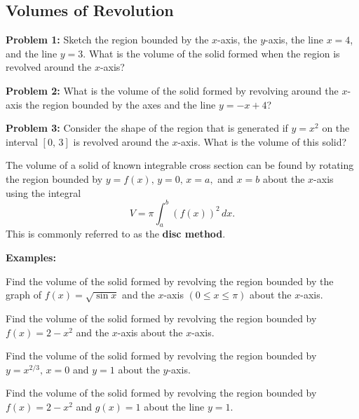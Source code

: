 \subsection*{Volumes of Revolution}
\textbf{Problem 1:} Sketch the region bounded by the $x$-axis, the $y$-axis, the line $x=4$, and the line $y=3$. What is the volume of the solid formed when the region is revolved around the $x$-axis?

\textbf{Problem 2:} What is the volume of the solid formed by revolving around the $x$-axis the region bounded by the axes and the line $y=-x+4$?

\textbf{Problem 3:} Consider the shape of the region that is generated if $y=x^2$ on the interval $[0,\,3]$ is revolved around the $x$-axis. What is the volume of this solid?

\newpage


\begin{tcolorbox}[title= VOLUME OF A SOLID OF REVOLUTION,colframe=black,sharp corners,colback=white,colbacktitle=white,coltitle=black,boxrule=1pt]

     The volume of a solid of known integrable cross section can be found by rotating the region bounded by $y=f(x),\,y=0,\,x=a,$ and $x=b$ about the $x$-axis using the integral
     \[V=\pi\int_a^b\left(f(x)\right)^2\,dx.\]
     This is commonly referred to as the \textbf{disc method}.
    
\end{tcolorbox}
\textbf{Examples:}
\begin{questions}
    \question Find the volume of the solid formed by revolving the region bounded by the graph of $f(x)=\sqrt{\sin x}$ and the $x$-axis $\left(0\le x\le\pi\right)$ about the $x$-axis.
    
    \question Find the volume of the solid formed by revolving the region bounded by $f(x)=2-x^2$ and the $x$-axis about the $x$-axis.
    
    \question Find the volume of the solid formed by revolving the region bounded by $y=x^{2/3},\, x=0$ and $y=1$ about the $y$-axis.
    
    \newpage
    
    \question Find the volume of the solid formed by revolving the region bounded by $f(x)=2-x^2$ and $g(x)=1$ about the line $y=1$.

\end{questions}

